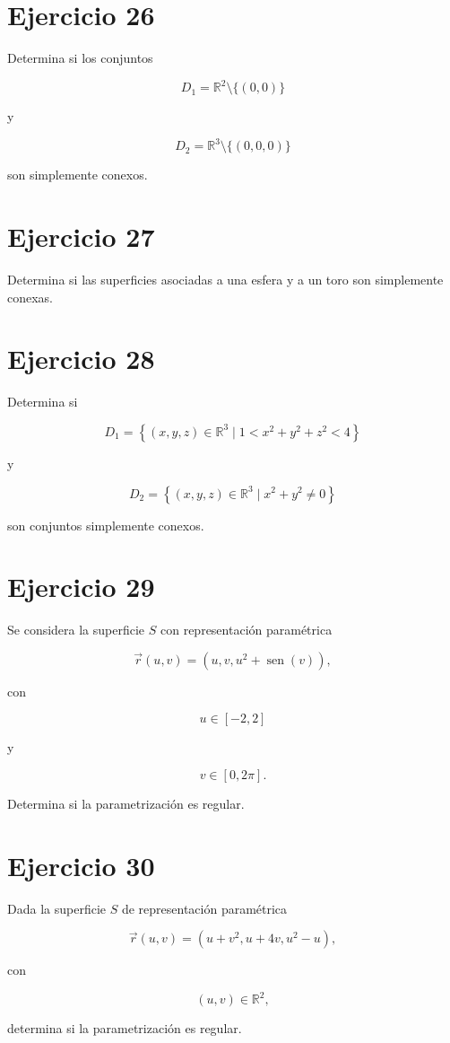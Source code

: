 \documentclass[11pt,a4paper]{article}
\newcommand{\R}{\mathbb{R}}
\newcommand{\sen}{\operatorname{sen}}
\begin{document}
\section{Ejercicio 26}

Determina si los conjuntos

\[
D_1
=
\R^2\setminus\{(0,0)\}
\]

y

\[
D_2
=
\R^3\setminus\{(0,0,0)\}
\]

son simplemente conexos.

\section{Ejercicio 27}

Determina si las superficies asociadas a una esfera y a un toro son simplemente conexas.

\section{Ejercicio 28}

Determina si

\[
D_1
=
\left\{
(x,y,z)\in\R^3
\mid
1<x^2+y^2+z^2<4
\right\}
\]

y

\[
D_2
=
\left\{
(x,y,z)\in\R^3
\mid
x^2+y^2\neq0
\right\}
\]

son conjuntos simplemente conexos.

\section{Ejercicio 29}

Se considera la superficie \(S\) con representación paramétrica

\[
\vec r(u,v)
=
(u,v,u^2+\sen(v)),
\]

con

\[
u\in[-2,2]
\]

y

\[
v\in[0,2\pi].
\]

Determina si la parametrización es regular.

\section{Ejercicio 30}

Dada la superficie \(S\) de representación paramétrica

\[
\vec r(u,v)
=
(u+v^2,u+4v,u^2-u),
\]

con

\[
(u,v)\in\R^2,
\]

determina si la parametrización es regular.
\end{document}

